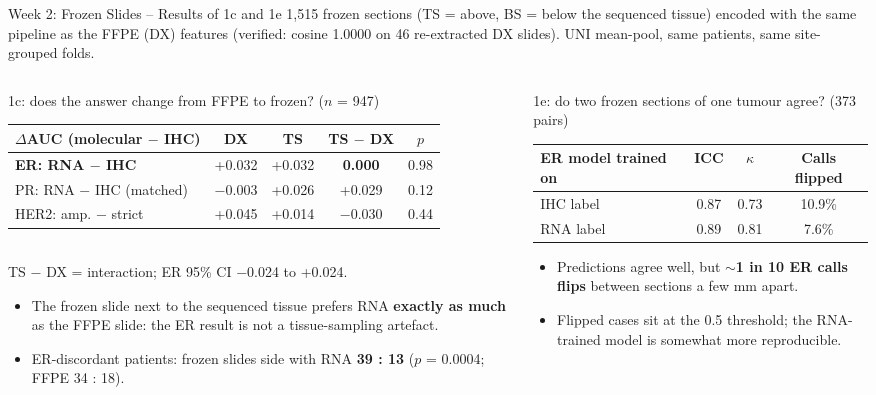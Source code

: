\documentclass[aspectratio=169,10pt]{beamer}
\begin{document}
\begin{frame}[t]{Week 2: Frozen Slides -- Results of 1c and 1e}
\footnotesize
1,515 frozen sections (TS = above, BS = below the sequenced tissue) encoded with the same pipeline as the FFPE (DX)
features (verified: cosine 1.0000 on 46 re-extracted DX slides). UNI mean-pool, same patients, same site-grouped folds.

\vspace{6pt}
\begin{columns}[T]
\begin{column}{0.56\textwidth}
\begin{block}{1c: does the answer change from FFPE to frozen? ($n$ = 947)}
\centering
\scriptsize
\begin{tabular}{lcccc}
\toprule
$\Delta$AUC (molecular $-$ IHC) & DX & TS & TS $-$ DX & $p$ \\
\midrule
\textbf{ER: RNA $-$ IHC} & +0.032 & +0.032 & \textbf{0.000} & 0.98 \\
PR: RNA $-$ IHC (matched) & $-$0.003 & +0.026 & +0.029 & 0.12 \\
HER2: amp. $-$ strict & +0.045 & +0.014 & $-$0.030 & 0.44 \\
\bottomrule
\end{tabular}\\[2pt]
{\tiny TS $-$ DX = interaction; ER 95\% CI $-$0.024 to +0.024.}
\end{block}
\begin{itemize}
  \item The frozen slide next to the sequenced tissue prefers RNA \textbf{exactly as much} as the FFPE slide:
        the ER result is not a tissue-sampling artefact.
  \item ER-discordant patients: frozen slides side with RNA \textbf{39 : 13} ($p$ = 0.0004; FFPE 34 : 18).
\end{itemize}
\end{column}
\begin{column}{0.41\textwidth}
\begin{block}{1e: do two frozen sections of one tumour agree? (373 pairs)}
\centering
\scriptsize
\begin{tabular}{lccc}
\toprule
ER model trained on & ICC & $\kappa$ & Calls flipped \\
\midrule
IHC label & 0.87 & 0.73 & 10.9\% \\
RNA label & 0.89 & 0.81 & 7.6\% \\
\bottomrule
\end{tabular}
\end{block}
\begin{itemize}
  \item Predictions agree well, but \textbf{$\sim$1 in 10 ER calls flips} between sections a few mm apart.
  \item Flipped cases sit at the 0.5 threshold; the RNA-trained model is somewhat more reproducible.
\end{itemize}
\end{column}
\end{columns}
\end{frame}
\end{document}
